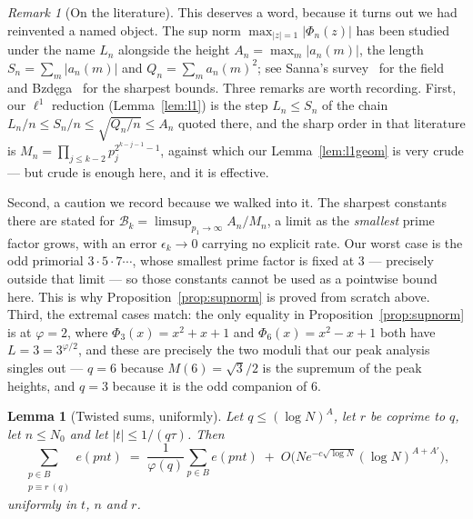 \documentclass[11pt,a4paper]{article}
\theoremstyle{plain}
\newtheorem{lemma}[theorem]{Lemma}
\theoremstyle{definition}
\theoremstyle{remark}
\newtheorem{remark}[theorem]{Remark}
\begin{document}
\begin{remark}[On the literature]\label{rem:bzdega}
This deserves a word, because it turns out we had reinvented a named object.
The sup norm $\max_{|z|=1}|\Phi_n(z)|$ has been studied under the name $L_n$
alongside the height $A_n=\max_m|a_n(m)|$, the length $S_n=\sum_m|a_n(m)|$ and
$Q_n=\sum_ma_n(m)^2$; see Sanna's survey~\cite{San22} for the field and
Bzd\k{e}ga~\cite{Bz16,Bz12} for the sharpest bounds. Three remarks are worth
recording. First, our $\ell^{1}$ reduction (Lemma~\ref{lem:l1}) is the step
$L_n\le S_n$ of the chain $L_n/n\le S_n/n\le\sqrt{Q_n/n}\le A_n$ quoted there,
and the sharp order in that literature is $M_n=\prod_{j\le k-2}p_j^{2^{k-j-1}-1}$,
against which our Lemma~\ref{lem:l1geom} is very crude --- but crude is enough
here, and it is effective.

Second, a caution we record because we walked into it. The sharpest constants
there are stated for $\mathcal{B}_k=\limsup_{p_1\to\infty}A_n/M_n$, a limit as
the \emph{smallest} prime factor grows, with an error $\epsilon_k\to0$ carrying
no explicit rate. Our worst case is the odd primorial $3\cdot5\cdot7\cdots$,
whose smallest prime factor is fixed at $3$ --- precisely outside that limit ---
so those constants cannot be used as a pointwise bound here. This is why
Proposition~\ref{prop:supnorm} is proved from scratch above.
Third, the extremal cases match: the only equality in
Proposition~\ref{prop:supnorm} is at $\varphi=2$, where
$\Phi_3(x)=x^2+x+1$ and $\Phi_6(x)=x^2-x+1$ both have $L=3=3^{\varphi/2}$, and
these are precisely the two moduli that our peak analysis singles out --- $q=6$
because $M(6)=\sqrt3/2$ is the supremum of the peak heights, and $q=3$ because
it is the odd companion of $6$.
\end{remark}


\begin{lemma}[Twisted sums, uniformly]\label{lem:twist}
Let $q\le(\log N)^{A}$, let $r$ be coprime to $q$, let $n\le N_0$ and let
$|t|\le1/(q\tau)$. Then
\[
  \sum_{\substack{p\in B\\ p\equiv r\ (q)}}e(pnt)
  \;=\;\frac{1}{\varphi(q)}\sum_{p\in B}e(pnt)
   \;+\;O\!\bigl(N e^{-c\sqrt{\log N}}(\log N)^{A+A'}\bigr),
\]
uniformly in $t$, $n$ and $r$.
\end{lemma}
\end{document}
